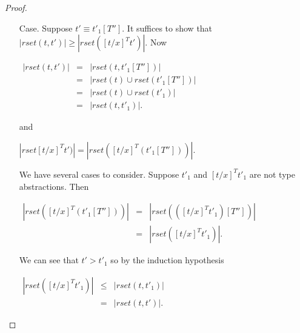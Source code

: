 \begin{proof}
\begin{itemize}
\item[Case.] Suppose $t' \equiv t'_1[T'']$.  It suffices to show that 
  $|rset(t,t')| \geq |rset([t/x]^T t')|$.  Now 
  \begin{center}
    \begin{math}
      \begin{array}{lll}
        |rset(t,t')| & = & |rset(t,t'_1[T''])|\\
        & = & |rset(t) \cup rset(t'_1[T''])|\\
        & = & |rset(t) \cup rset(t'_1)|\\
        & = & |rset(t,t'_1)|.
      \end{array}
    \end{math}
  \end{center}
  and
  \begin{center}
    $|rset[t/x]^T t')| = |rset([t/x]^T(t'_1[T'']))|$.
  \end{center}
  We have several cases to consider.  Suppose $t'_1$ and $[t/x]^T t'_1$ are not type abstractions.
  Then 
  \begin{center}
    \begin{math}
      \begin{array}{lll}
        |rset([t/x]^T(t'_1[T'']))| & = & |rset(([t/x]^T t'_1)[T''])|\\
        & = & |rset([t/x]^T t'_1)|.
      \end{array}
    \end{math}
  \end{center}
  We can see that $t' > t'_1$ so by the induction hypothesis 
  \begin{center}
    \begin{math}
      \begin{array}{lll}
        |rset([t/x]^T t'_1)| & \leq & |rset(t,t'_1)|\\
        & = & |rset(t,t')|.
      \end{array}
    \end{math}
  \end{center}
  

\end{itemize}
\end{proof}
